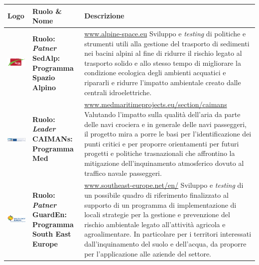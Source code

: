 \begin{longtable}{ p{} | p{} | p{}}

\textbf{Logo}& \textbf{Ruolo \& Nome}&  \textbf{Descrizione}\\

 \endhead
\midrule
\vfill \includegraphics[scale=0.8]{./capitoli/capitolo1/img/alpini} & \vfill \textbf{{\color{Plum}Ruolo}: \textit{Patner}} \newline \vfill \textbf{{\color{ForestGreen}SedAlp}: Programma Spazio Alpino}  &    \url{www.alpine-space.eu} \newline
 Sviluppo e \textit{testing} di politiche e strumenti utili alla gestione del trasporto di sedimenti nei bacini alpini al fine di ridurre il rischio legato al trasporto solido e allo stesso tempo di migliorare la condizione ecologica degli ambienti acquatici e ripararli e ridurre l'impatto ambientale creato dalle centrali idroelettriche. \\
\midrule
\vfill \includegraphics[scale=0.7]{./capitoli/capitolo1/img/med} & \vfill \textbf{{\color{Plum}Ruolo}: \textit{Leader}} \newline \vfill \textbf{{\color{ForestGreen}CAIMANs}: Programma Med} & \url{www.medmaritimeprojects.eu/section/caimans} \newline Valutando l'impatto sulla qualità dell'aria da parte delle navi crociera e in generale delle navi passeggeri, il progetto mira a porre le basi per l'identificazione dei punti critici e per proporre orientamenti per futuri progetti e politiche trasnazionali che affrontino la mitigazione dell'inquinamento atmosferico dovuto al traffico navale passeggeri. \\
\midrule
\vfill \includegraphics[scale=0.7]{./capitoli/capitolo1/img/park} & \vfill \textbf{{\color{Plum}Ruolo}: \textit{Patner}} \newline \vfill \textbf{ {\color{ForestGreen}GuardEn}: Programma South East Europe } & \url{www.southeast-europe.net/en/} \newline Sviluppo e \textit{testing} di un possibile quadro di riferimento finalizzato al supporto di un programma di implementazione di locali strategie per la gestione e prevenzione del rischio ambientale legato all'attività agricola e agroalimentare. In particolare per i territori interessati dall'inquinamento del suolo e dell'acqua, da proporre per l'applicazione alle aziende del settore.\\

\end{longtable}
